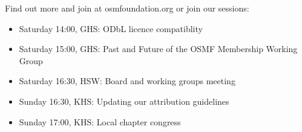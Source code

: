 \begin{landscape}
{    Find out more and join at osmfoundation.org
    or join our sessions:
    \begin{itemize}
      \RaggedRight
      \setlength{\itemsep}{-3pt} %
      \item Saturday 14:00, GHS: ODbL licence compatiblity
      \item Saturday 15:00, GHS: Past and Future of the OSMF Membership Working Group
      \item Saturday 16:30, HSW: Board and working groups meeting
      \item Sunday 16:30, KHS: Updating our attribution guidelines
      \item Sunday 17:00, KHS: Local chapter congress
    \end{itemize}
    \justifying
  }%


  \setlength{\fboxsep}{4.5pt}%
  \vspace{0.5\baselineskip}%
  \noindent%
  \setlength{\fboxsep}{3pt}

\end{landscape}

\newpage
